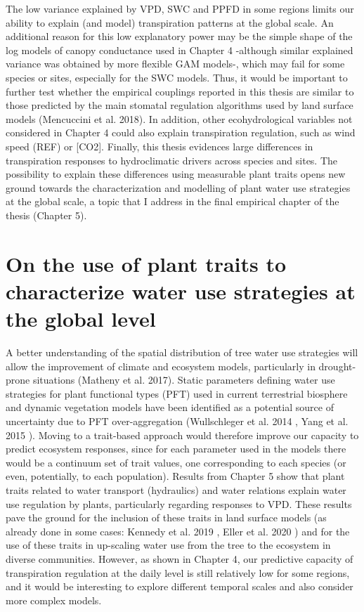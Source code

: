 \documentclass[11pt,twoside]{reedthesis}
\begin{document}
The low variance explained by VPD, SWC and PPFD in some regions limits
our ability to explain (and model) transpiration patterns at the global
scale. An additional reason for this low explanatory power may be the
simple shape of the log models of canopy conductance used in Chapter 4
-although similar explained variance was obtained by more flexible GAM
models-, which may fail for some species or sites, especially for the
SWC models. Thus, it would be important to further test whether the
empirical couplings reported in this thesis are similar to those
predicted by the main stomatal regulation algorithms used by land
surface models (Mencuccini et al. 2018). In addition, other
ecohydrological variables not considered in Chapter 4 could also explain
transpiration regulation, such as wind speed (REF) or {[}CO2{]}.
Finally, this thesis evidences large differences in transpiration
responses to hydroclimatic drivers across species and sites. The
possibility to explain these differences using measurable plant traits
opens new ground towards the characterization and modelling of plant
water use strategies at the global scale, a topic that I address in the
final empirical chapter of the thesis (Chapter 5).\par

\section{On the use of plant traits to characterize water use strategies
at the global
level}\label{on-the-use-of-plant-traits-to-characterize-water-use-strategies-at-the-global-level}

A better understanding of the spatial distribution of tree water use
strategies will allow the improvement of climate and ecosystem models,
particularly in drought-prone situations (Matheny et al. 2017). Static
parameters defining water use strategies for plant functional types
(PFT) used in current terrestrial biosphere and dynamic vegetation
models have been identified as a potential source of uncertainty due to
PFT over-aggregation (Wullschleger et al. 2014 , Yang et al. 2015 ).
Moving to a trait-based approach would therefore improve our capacity to
predict ecosystem responses, since for each parameter used in the models
there would be a continuum set of trait values, one corresponding to
each species (or even, potentially, to each population). Results from
Chapter 5 show that plant traits related to water transport (hydraulics)
and water relations explain water use regulation by plants, particularly
regarding responses to VPD. These results pave the ground for the
inclusion of these traits in land surface models (as already done in
some cases: Kennedy et al. 2019 , Eller et al. 2020 ) and for the use of
these traits in up-scaling water use from the tree to the ecosystem in
diverse communities. However, as shown in Chapter 4, our predictive
capacity of transpiration regulation at the daily level is still
relatively low for some regions, and it would be interesting to explore
different temporal scales and also consider more complex models.\par
\end{document}
